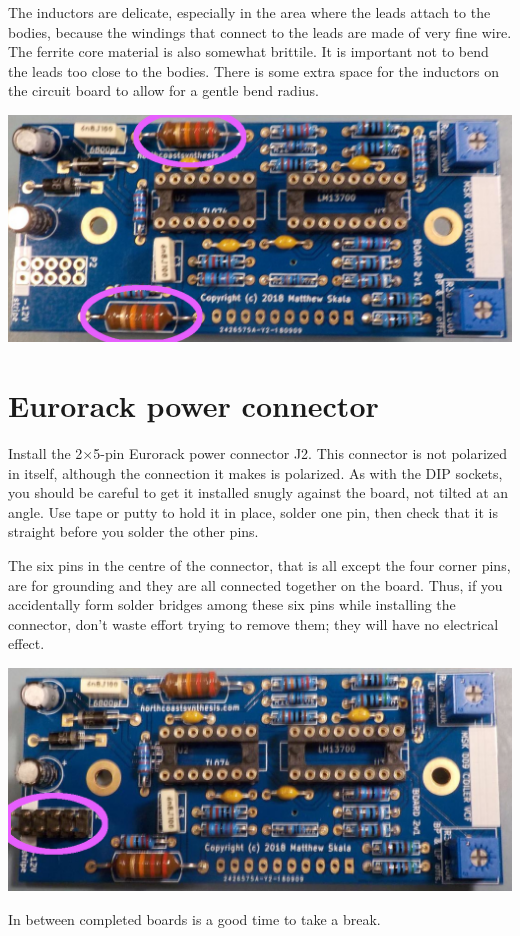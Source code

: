 The inductors are delicate, especially in the area where the leads attach to
the bodies, because the windings that connect to the leads are made of very
fine wire.  The ferrite core material is also somewhat brittile.  It is
important not to bend the leads too close to the bodies.  There is some
extra space for the inductors on the circuit board to allow for a gentle
bend radius.

\nopagebreak
\noindent\includegraphics[width=\linewidth]{coils.jpg}

\section{Eurorack power connector}

Install the 2$\times$5-pin Eurorack power connector J2.  This connector is
not polarized in itself, although the connection it makes is polarized.  As
with the DIP sockets, you should be careful to get it installed snugly
against the board, not tilted at an angle.  Use tape or putty to
hold it in place, solder one pin, then check that it is straight before you
solder the other pins.

The six pins in the centre of the connector, that is all except the four
corner pins, are for grounding and they are all connected together on the
board.  Thus, if you accidentally form solder bridges among these six pins
while installing the connector, don't waste effort trying to remove them;
they will have no electrical effect.

\nopagebreak
\noindent\includegraphics[width=\linewidth]{power.jpg}

In between completed boards is a good time to take a break.


